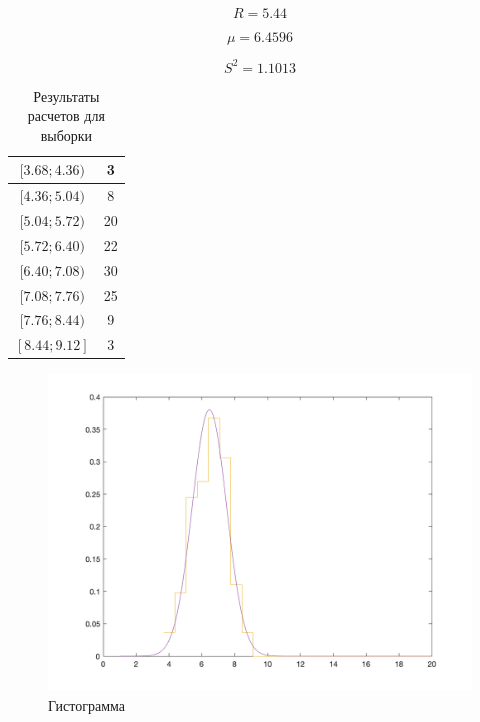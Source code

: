 \documentclass[12pt, a4paper]{report}
\begin{document}
	\begin{equation*}
	R = 5.44
	\end{equation*}
	
	\begin{equation*}
	\mu = 6.4596
	\end{equation*}
	
	\begin{equation*}
	S^2 = 1.1013
	\end{equation*}
	
	\begin{table}[H]
		\centering
		\begin{tabular}{|c|c|}
			\hline
			$[3.68;4.36)$ & 3 \\
			\hline
			$[4.36;5.04)$ & 8 \\
			\hline
			$[5.04;5.72)$ & 20 \\
			\hline
			$[5.72;6.40)$ & 22 \\
			\hline
			$[6.40;7.08)$ & 30 \\
			\hline
			$[7.08;7.76)$ & 25 \\
			\hline
			$[7.76;8.44)$ & 9 \\
			\hline
			$[8.44;9.12]$ & 3 \\
			\hline
		\end{tabular}
		\caption{Результаты расчетов для выборки}
	\end{table}

	\newpage


	\begin{figure}[H]
		\centering
		\includegraphics[scale=0.52]{img/Gistogramma.png}
		\caption{Гистограмма}
	\end{figure}
\end{document}
